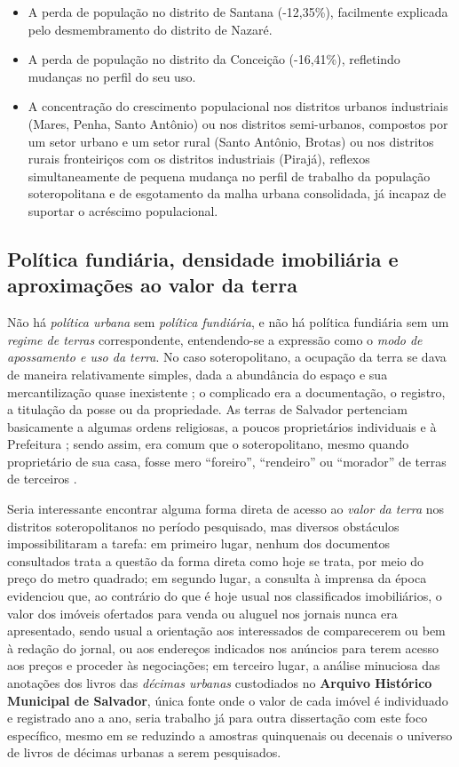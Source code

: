 \begin{itemize}
\item A perda de população no distrito de Santana (-12,35\%), facilmente explicada pelo desmembramento do distrito de Nazaré.
\item A perda de população no distrito da Conceição (-16,41\%), refletindo mudanças no perfil do seu uso.
\item A concentração do crescimento populacional nos distritos urbanos industriais (Mares, Penha, Santo Antônio) ou nos distritos semi-urbanos, compostos por um setor urbano e um setor rural (Santo Antônio, Brotas) ou nos distritos rurais fronteiriços com os distritos industriais (Pirajá), reflexos simultaneamente de pequena mudança no perfil de trabalho da população soteropolitana e de esgotamento da malha urbana consolidada, já incapaz de suportar o acréscimo populacional.
\end{itemize}

\subsection{Política fundiária, densidade imobiliária e aproximações ao valor da terra}\label{subsubsec:polfundvalter}

Não há \textit{política urbana} sem \textit{política fundiária}, e não há política fundiária sem um \textit{regime de terras} correspondente, entendendo-se a expressão como o \textit{modo de apossamento e uso da terra}. No caso soteropolitano, a ocupação da terra se dava de maneira relativamente simples, dada a abundância do espaço e sua mercantilização quase inexistente \cite[p.~25]{MOURA1990}; o complicado era a documentação, o registro, a titulação da posse ou da propriedade. As terras de Salvador pertenciam basicamente a algumas ordens religiosas, a poucos proprietários individuais e à Prefeitura \cite{CEDURB1978}; sendo assim, era comum que o soteropolitano, mesmo quando proprietário de sua casa, fosse mero ``foreiro'', ``rendeiro'' ou ``morador'' de terras de terceiros \cite[p.~139]{BRANDAO1980}. 

Seria interessante encontrar alguma forma direta de acesso ao \textit{valor da terra} nos distritos soteropolitanos no período pesquisado, mas diversos obstáculos impossibilitaram a tarefa: em primeiro lugar, nenhum dos documentos consultados trata a questão da forma direta como hoje se trata, por meio do preço do metro quadrado; em segundo lugar, a consulta à imprensa da época evidenciou que, ao contrário do que é hoje usual nos classificados imobiliários, o valor dos imóveis ofertados para venda ou aluguel nos jornais nunca era apresentado, sendo usual a orientação aos interessados de comparecerem ou bem à redação do jornal, ou aos endereços indicados nos anúncios para terem acesso aos preços e proceder às negociações; em terceiro lugar, a análise minuciosa das anotações dos livros das \textit{décimas urbanas} custodiados no \textbf{Arquivo Histórico Municipal de Salvador}, única fonte onde o valor de cada imóvel é individuado e registrado ano a ano, seria trabalho já para outra dissertação com este foco específico, mesmo em se reduzindo a amostras quinquenais ou decenais o universo de livros de décimas urbanas a serem pesquisados.

